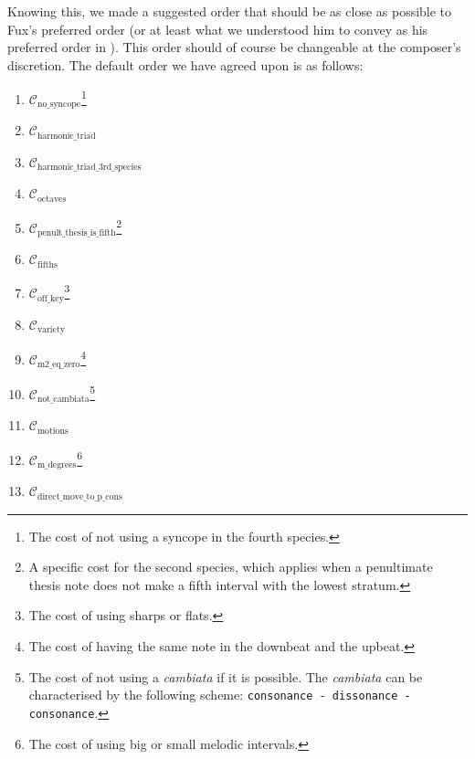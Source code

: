 Knowing this, we made a suggested order that should be as close as possible to Fux's preferred order (or at least what we understood him to convey as his preferred order in \gap). This order should of course be changeable at the composer's discretion. The default order we have agreed upon is as follows:

\begin{multicols}{2}
    \begin{enumerate}
        \item $\mathcal{C}_\text{no\_syncope}$\footnote{The cost of not using a syncope in the fourth species.}
        \item $\mathcal{C}_\text{harmonic\_triad}$
        \item $\mathcal{C}_\text{harmonic\_triad\_3rd\_species}$
        \item $\mathcal{C}_\text{octaves}$
        \item $\mathcal{C}_\text{penult\_thesis\_is\_fifth}$\footnote{A specific cost for the second species, which applies when a penultimate thesis note does not make a fifth interval with the lowest stratum.}
        \item $\mathcal{C}_\text{fifths}$
        \item $\mathcal{C}_\text{off\_key}$\footnote{The cost of using sharps or flats.}
        \item $\mathcal{C}_\text{variety}$
        \item $\mathcal{C}_\text{m2\_eq\_zero}$\footnote{The cost of having the same note in the downbeat and the upbeat.}
        \item $\mathcal{C}_\text{not\_cambiata}$\footnote{The cost of not using a \textit{cambiata} if it is possible. The \textit{cambiata} can be characterised by the following scheme: \texttt{consonance - dissonance - consonance}.}
        \item $\mathcal{C}_\text{motions}$
        \item $\mathcal{C}_\text{m\_degrees}$\footnote{The cost of using big or small melodic intervals.}        
        \item $\mathcal{C}_\text{direct\_move\_to\_p\_cons}$
    \end{enumerate}
\end{multicols}

